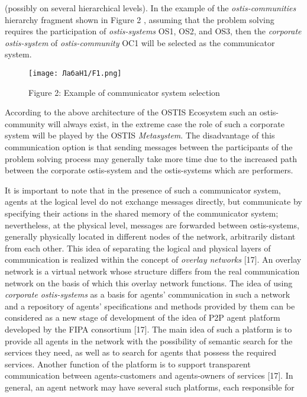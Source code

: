 \documentclass[12pt, a4paper]{article}
\begin{document}
\begin{multicols}{2}
\begin{itemize}
\begin{enumerate}[label=\textbf{--},leftmargin=*]
(possibly on several hierarchical levels). In the
example of the \textit{ostis-communities} hierarchy fragment shown in Figure 2 , assuming that the problem solving requires the participation of \textit{ostis-systems} OS1, OS2, and OS3, then the \textit{corporate
ostis-system} of \textit{ostis-community} OC1 will be selected as the communicator system.
\begin{figure}[H]
    \centering
    \texttt{[image: ЛабаН1/F1.png]}
    \caption {\fontsize{8}{7}\selectfont Figure 2: Example of communicator system selection}
    
\end{figure}
According to the above architecture of the OSTIS
Ecosystem such an ostis-community will always
exist, in the extreme case the role of such a
corporate system will be played by the OSTIS
\textit{Metasystem}. The disadvantage of this communication option is that sending messages between
the participants of the problem solving process
may generally take more time due to the increased
path between the corporate ostis-system and the
ostis-systems which are performers.
\end{enumerate}
It is important to note that in the presence of
such a communicator system, agents at the logical
level do not exchange messages directly, but communicate by specifying their actions in the shared
memory of the communicator system; nevertheless,
at the physical level, messages are forwarded between ostis-systems, generally physically located in
different nodes of the network, arbitrarily distant
from each other. This idea of separating the logical
and physical layers of communication is realized
within the concept of \textit{overlay networks} [17]. An
overlay network is a virtual network whose structure
differs from the real communication network on
the basis of which this overlay network functions.
The idea of using \textit{corporate ostis-systems} as a basis
for agents’ communication in such a network and
a repository of agents’ specifications and methods
provided by them can be considered as a new stage
of development of the idea of P2P agent platform
developed by the FIPA consortium [17]. The main
idea of such a platform is to provide all agents in the
network with the possibility of semantic search for
the services they need, as well as to search for agents
that possess the required services. Another function
of the platform is to support transparent communication between agents-customers and agents-owners
of services [17]. In general, an agent network may
have several such platforms, each responsible for

\end{itemize}
\end{multicols}
\end{document}
